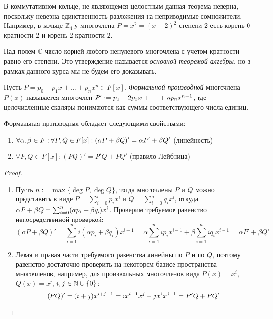 \begin{note}
	В коммутативном кольце, не являющемся целостным данная теорема неверна, поскольку неверна единственность разложения на неприводимые сомножители. Например, в кольце $\mathbb{Z}_4$ у многочлена $P = x^2 = (x - 2)^2$ степени $2$ есть корень $0$ кратности $2$ и корень $2$ кратности $2$.
\end{note}

\begin{note}
	Над полем $\mathbb{C}$ число корней любого ненулевого многочлена с учетом кратности равно его степени. Это утверждение называется \textit{основной теоремой алгебры}, но в рамках данного курса мы не будем его доказывать.
\end{note}

\begin{definition}
	Пусть $P = p_0 + p_1x + \dots + p_nx^n \in F[x]$. \textit{Формальной производной} многочлена $P(x)$ называется многочлен $P' \hm{:=} p_1 + 2p_2x + \dots + np_nx^{n - 1}$, где целочисленные скаляры понимаются как суммы соответствующего числа единиц.
\end{definition}

\begin{proposition}
	Формальная производная обладает следующими свойствами:
	\begin{enumerate}
		\item $\forall \alpha, \beta \in F: \forall P, Q \in F[x]: (\alpha P+ \beta Q)' \hm= \alpha P' + \beta Q'$ (линейность)
		\item $\forall P, Q \in F[x]: (PQ)' = P'Q + PQ'$ (правило Лейбница)
	\end{enumerate}
\end{proposition}

\begin{proof}~
	\begin{enumerate}
		\item Пусть $n := \max\{\deg{P}, \deg{Q}\}$, тогда многочлены $P$ и $Q$ можно представить в виде $P = \sum_{i = 0}^np_ix^i$ и $Q = \sum_{i = 0}^nq_ix^i$, откуда $\alpha P + \beta Q \hm= \sum_{i = 0}^n(\alpha p_i + \beta q_i)x^i$. Проверим требуемое равенство непосредственной проверкой:
		\[(\alpha P + \beta Q)' = \sum_{i = 1}^ni(\alpha p_i + \beta q_i)x^{i - 1} = \alpha\sum_{i = 1}^nip_ix^{i - 1} + \beta\sum_{i = 1}^niq_ix^{i - 1} = \alpha P' + \beta Q'\]
		
		\item Левая и правая части требуемого равенства линейны по $P$ и по $Q$, поэтому равенство достаточно проверить на некотором базисе пространства многочленов, например, для произвольных многочленов вида $P(x) = x^i$, $Q(x) = x^j$, $i, j \in \mathbb{N} \cup \{0\}$:
		\[(PQ)' = (i + j)x^{i + j - 1} = ix^{i - 1}x^j + jx^ix^{j - 1} = P'Q + PQ'\qedhere\]
	\end{enumerate}
\end{proof}

